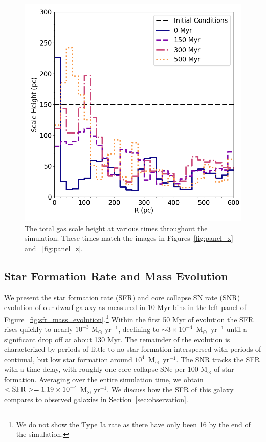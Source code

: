 \documentclass[fleqn,usenatbib,useAMS]{mnras}
\begin{document}
\begin{figure}
\centering
\includegraphics[width=0.975\linewidth]{scale_height}
\caption{The total gas scale height at various times throughout the simulation. These times match the images in Figures~\ref{fig:panel_x} and ~\ref{fig:panel_z}.}
\label{fig:scale_height}
\end{figure}

\subsection{Star Formation Rate and Mass Evolution}
\label{sec:sfr}

We present the star formation rate (SFR) and core collapse SN rate (SNR) evolution of our dwarf galaxy as measured in 10 Myr bins in the left panel of Figure~\ref{fig:sfr_mass_evolution}.\footnote{We do not show the Type Ia rate as there have only been 16 by the end of the simulation.} Within the first 50 Myr of evolution the SFR rises quickly to nearly $10^{-3}$ M$_{\odot}$ yr$^{-1}$, declining to $\sim 3 \times 10^{-4}$~M$_{\odot}$~yr$^{-1}$ until a significant drop off at about 130 Myr. The remainder of the evolution is characterized by periods of little to no star formation interspersed with periods of continual, but low star formation around $10^{4}$~M$_{\odot}$~yr$^{-1}$. The SNR tracks the SFR with a time delay, with roughly one core collapse SNe per 100 M$_{\odot}$ of star formation. Averaging over the entire simulation time, we obtain  $<\rm{SFR}> = 1.19 \times 10^{-4}$ M$_{\odot}$ yr$^{-1}$. We discuss how the SFR of this galaxy compares to observed galaxies in Section~\ref{sec:observation}.
\end{document}
